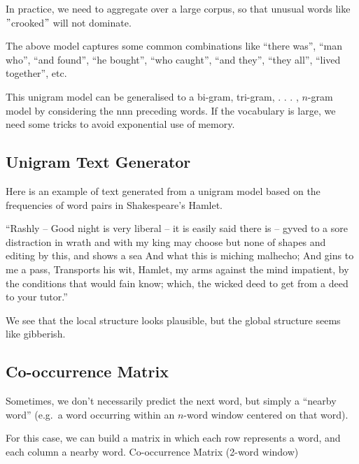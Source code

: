 \documentclass[11pt]{article}
\begin{document}
In practice, we need to aggregate over a large corpus, so that unusual words
like \("\)crooked\("\) will not dominate.

The above model captures some common combinations like “there was”, “man who”,
“and found”, “he bought”, “who caught”, “and they”, “they all”, “lived
together”, etc.

This unigram model can be generalised to a bi-gram, tri-gram, .
. . , $n$-gram model by considering the nnn preceding words.
If the vocabulary is large, we need some tricks to avoid exponential use of memory.

\subsection{Unigram Text Generator}\label{subsec:unigram-text-generator}
Here is an example of text generated from a unigram model based on the
frequencies of word pairs in Shakespeare's Hamlet.

“Rashly – Good night is very liberal – it is easily said there is – gyved to a
sore distraction in wrath and with my king may choose but none of shapes and
editing by this, and shows a sea And what this is miching malhecho;
And gins to me a pass, Transports his wit, Hamlet, my arms against the mind
impatient, by the conditions that would fain know;
which, the wicked deed to get from a deed to your tutor.”

We see that the local structure looks plausible, but the global structure seems
like gibberish.

\subsection{Co-occurrence Matrix}\label{subsec:co-occurrence-matrix}
Sometimes, we don’t necessarily predict the next word, but simply a “nearby
word” (e.g.\ a word occurring within an $n$-word window centered on that word).

For this case, we can build a matrix in which each row represents a word, and each column a nearby word.
Co-occurrence Matrix (2-word window)
\end{document}
